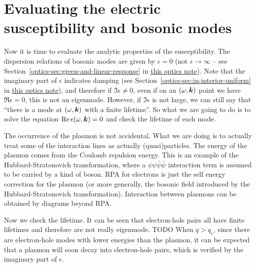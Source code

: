 \documentclass[hyperref, a4paper]{article}
\newcommand{\opticsdoc}{\href{../optics/optics.pdf}{this optics note}}
\begin{document}

\section{Evaluating the electric susceptibility and bosonic modes}\label{sec:boson-modes}

Now it is time to evaluate the analytic properties of the susceptibility. 
The dispersion relations of bosonic modes are given by $\epsilon = 0$ (not $\epsilon \to \infty$ -- see 
Section~\ref{optics-sec:green-and-linear-response} in \opticsdoc). 
Note that the imaginary part of $\epsilon$ indicates damping (see Section~\ref{optics-sec:in-interior-uniform}
in \opticsdoc), and therefore if $\Im \epsilon \neq 0$, even if on an $(\omega, \vb*{k})$ point we have 
$\Re \epsilon = 0$, this is not an eigenmode. However, if $\Im \epsilon$ is not large, we can still say 
that ``there is a mode at $(\omega, \vb*{k})$ with a finite lifetime''. So what we are going to do is 
to solve the equation $\Re \epsilon(\omega, \vb*{k}) = 0$ and check the lifetime of each mode.

\begin{note*}{}
    The occurrence of the plasmon is not accidental. What we are doing is to actually treat some of the 
    interaction lines as actually (quasi)particles. The energy of the plasmon comes from the Coulomb 
    repulsion energy. This is an example of the Hubbard-Stratonovich transformation, where a $\psi \psi 
    \bar{\psi} \bar{\psi}$ interaction term is assumed to be carried by a kind of boson. RPA for electrons 
    is just the self energy correction for the plasmon (or more generally, the bosonic field introduced 
    by the Hubbard-Stratonovich transformation). Interaction between plasmons can be obtained by diagrams 
    beyond RPA. 
\end{note*}

Now we check the lifetime. It can be seen that electron-hole pairs all have finite lifetimes and therefore 
are not really eigenmode. TODO When $q > q_\text{c}$, since there are electron-hole modes with lower energies 
than the plasmon, it can be expected that a plasmon will soon decay into electron-hole pairs, which is 
verified by the imaginary part of $\epsilon$. 
\end{document}
